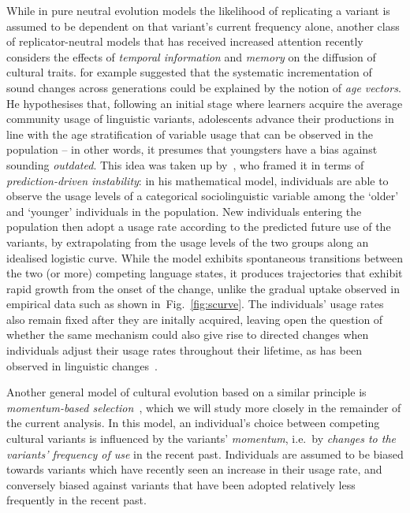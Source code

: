 \documentclass[10pt]{article}
\begin{document}
While in pure neutral evolution models the likelihood of replicating a variant is assumed to be dependent on that variant's current frequency alone, another class of replicator-neutral models that has received increased attention recently considers the effects of \emph{temporal information} and \emph{memory} on the diffusion of cultural traits. 
\citet{Labov2001} for example suggested that the systematic incrementation of sound changes across generations could be explained by the notion of \emph{age vectors}.
He hypothesises that, following an initial stage where learners acquire the average community usage of linguistic variants, adolescents advance their productions in line with the age stratification of variable usage that can be observed in the population -- in other words, it presumes that youngsters have a bias against sounding \emph{outdated}. This idea was taken up by~\citet{Mitchener2011}, who framed it in terms of \emph{prediction-driven instability}: in his mathematical model, individuals are able to observe the usage levels of a categorical sociolinguistic variable among the `older' and `younger' individuals in the population. New individuals entering the population then adopt a usage rate according to the predicted future use of the variants, by extrapolating from the usage levels of the two groups along an idealised logistic curve. While the model exhibits spontaneous transitions between the two (or more) competing language states, it produces trajectories that exhibit rapid growth from the onset of the change, unlike the gradual uptake observed in empirical data such as shown in~Fig.~\ref{fig:scurve}. 
The individuals' usage rates also remain fixed after they are initally acquired, leaving open the question of whether the same mechanism could also give rise to directed changes when individuals adjust their usage rates throughout their lifetime, as has been observed in linguistic changes~\citep{Sankoff2007}.

Another general model of cultural evolution based on a similar principle is \emph{momentum-based selection}~\citep{Gureckis2009}, which we will study more closely in the remainder of the current analysis. In this model, an individual's choice between competing cultural variants is influenced by the variants' \emph{momentum}, i.e.~by \emph{changes to the variants' frequency of use} in the recent past. Individuals are assumed to be biased towards variants which have recently seen an increase in their usage rate, and conversely biased against variants that have been adopted relatively less frequently in the recent past.
\end{document}
